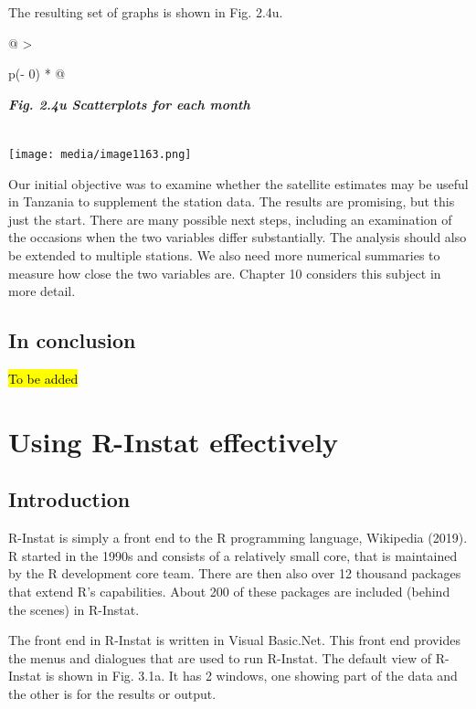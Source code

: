 \documentclass[
  letterpaper,
  DIV=11,
  numbers=noendperiod]{scrreprt}
\begin{document}
The resulting set of graphs is shown in Fig. 2.4u.

\begin{longtable}[]{@{}
  >{\raggedright\arraybackslash}p{(\columnwidth - 0\tabcolsep) * }@{}}
\toprule\noalign{}
\begin{minipage}[b]{\linewidth}\raggedright
\textbf{\emph{Fig. 2.4u Scatterplots for each month}}
\end{minipage} \\
\midrule\noalign{}
\endhead
\bottomrule\noalign{}
\endlastfoot
\texttt{[image: media/image1163.png]} \\
\end{longtable}

Our initial objective was to examine whether the satellite estimates may
be useful in Tanzania to supplement the station data. The results are
promising, but this just the start. There are many possible next steps,
including an examination of the occasions when the two variables differ
substantially. The analysis should also be extended to multiple
stations. We also need more numerical summaries to measure how close the
two variables are. Chapter 10 considers this subject in more detail.

\section{In conclusion}\label{in-conclusion}

\hl{To be added}


\chapter{Using R-Instat effectively}\label{using-r-instat-effectively}

\section{Introduction}\label{introduction-1}

R-Instat is simply a front end to the R programming language, Wikipedia
(2019). R started in the 1990s and consists of a relatively small core,
that is maintained by the R development core team. There are then also
over 12 thousand packages that extend R's capabilities. About 200 of
these packages are included (behind the scenes) in R-Instat.

The front end in R-Instat is written in Visual Basic.Net. This front end
provides the menus and dialogues that are used to run R-Instat. The
default view of R-Instat is shown in Fig. 3.1a. It has 2 windows, one
showing part of the data and the other is for the results or output.
\end{document}
